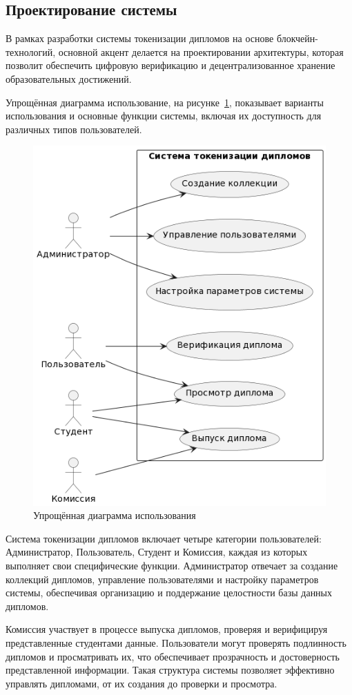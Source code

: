 \subsection{Проектирование системы}

В рамках разработки системы токенизации дипломов на основе блокчейн-технологий, основной акцент делается на проектировании архитектуры, которая позволит обеспечить цифровую верификацию и децентрализованное хранение образовательных достижений.

Упрощённая диаграмма использование, на рисунке~\ref{fig:uscs}, показывает варианты использования и основные функции системы, включая их доступность для различных типов пользователей.

\begin{figure}[H]
	\centering
	\includegraphics[width=.6\textwidth]{images/uscs.png}
	\parskip=6pt
	\caption{Упрощённая диаграмма использования}
	\label{fig:uscs}
\end{figure}

Система токенизации дипломов включает четыре категории пользователей: Администратор, Пользователь, Студент и Комиссия, каждая из которых выполняет свои специфические функции. Администратор отвечает за создание коллекций дипломов, управление пользователями и настройку параметров системы, обеспечивая организацию и поддержание целостности базы данных дипломов.

Комиссия участвует в процессе выпуска дипломов, проверяя и верифицируя представленные студентами данные. Пользователи могут проверять подлинность дипломов и просматривать их, что обеспечивает прозрачность и достоверность представленной информации. Такая структура системы позволяет эффективно управлять дипломами, от их создания до проверки и просмотра.

